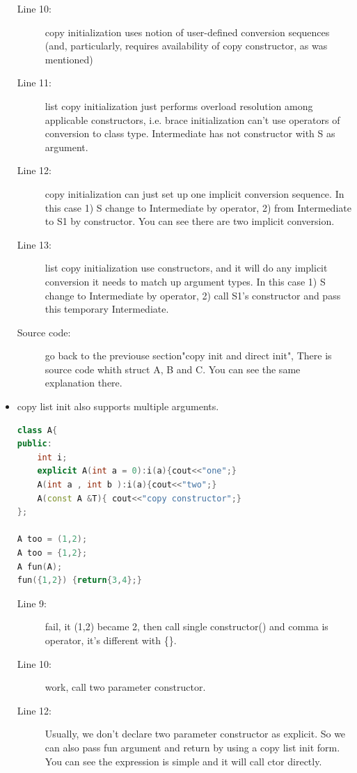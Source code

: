 \documentclass[a4paper,11pt,twoside]{book}
\begin{document}
\begin{itemize}
	\begin{description}
		\item[Line 10:] copy initialization uses notion of user-defined conversion sequences (and, particularly, requires availability of copy constructor, as was mentioned)
		
		\item[Line 11:] list copy initialization just performs overload resolution among applicable constructors, i.e. brace initialization can't use operators of conversion to class type. Intermediate has not constructor with S as argument.
		
		\item[Line 12:] copy initialization can just set up one implicit conversion sequence. In this case 1) S change to Intermediate by operator, 2) from Intermediate to S1 by constructor.  You can see there are two implicit conversion.
		
		\item[Line 13:] list copy initialization use constructors, and it will do any implicit conversion it needs to match up argument types. In this case 1) S change to Intermediate by operator, 2) call S1's constructor and pass this temporary Intermediate.
		\item [Source code:] go back to the previouse section"copy init and direct init", There is source code whith struct A, B and C. You can see the same explanation there. 
	\end{description}
	
	\item copy list init also supports multiple arguments.
\begin{lstlisting}[frame=single, language=c++]
class A{
public:
	int i;
	explicit A(int a = 0):i(a){cout<<"one";}
	A(int a , int b ):i(a){cout<<"two";}
	A(const A &T){ cout<<"copy constructor";} 
};
		
A too = (1,2); 
A too = {1,2};
A fun(A);
fun({1,2}) {return{3,4};}
\end{lstlisting}
	\begin{description}
		\item[Line 9:] fail, it (1,2) became 2, then call single constructor() and comma is operator, it's different with \{\}.
		
		\item[Line 10:] work, call two parameter constructor. 
		
		\item[Line 12:] Usually, we don't declare two parameter constructor as explicit. So we can also pass fun argument and return by using a copy list init form. You can see the expression is simple and it will call ctor directly. 
	\end{description}
	

\end{itemize}
\end{document}
